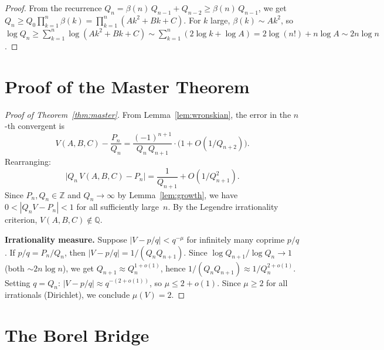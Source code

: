 \documentclass[11pt,a4paper]{article}
\theoremstyle{definition}
\theoremstyle{remark}
\begin{document}
\begin{proof}
From the recurrence $Q_n = \beta(n)\,Q_{n-1} + Q_{n-2} \ge \beta(n)\,Q_{n-1}$,
we get $Q_n \ge Q_0 \prod_{k=1}^{n} \beta(k) = \prod_{k=1}^{n}(Ak^2+Bk+C)$.
For $k$ large, $\beta(k) \sim Ak^2$, so
$\log Q_n \ge \sum_{k=1}^{n} \log(Ak^2+Bk+C)
\sim \sum_{k=1}^{n}(2\log k + \log A)
= 2\log(n!) + n\log A \sim 2n\log n$.
\end{proof}


\section{Proof of the Master Theorem}\label{sec:proof}

\begin{proof}[Proof of Theorem~\ref{thm:master}]
From Lemma~\ref{lem:wronskian}, the error in the $n$-th convergent is
\begin{equation}\label{eq:error}
  V(A,B,C) - \frac{P_n}{Q_n}
  = \frac{(-1)^{n+1}}{Q_n\,Q_{n+1}}
  \cdot\bigl(1 + O(1/Q_{n+2})\bigr).
\end{equation}
Rearranging:
\begin{equation}\label{eq:legendre}
  \bigl|Q_n\,V(A,B,C) - P_n\bigr| = \frac{1}{Q_{n+1}} + O(1/Q_{n+1}^2).
\end{equation}
Since $P_n, Q_n \in \mathbb{Z}$ and $Q_n \to \infty$ by
Lemma~\ref{lem:growth}, we have
$0 < |Q_n V - P_n| < 1$ for all sufficiently large~$n$.
By the Legendre irrationality criterion, $V(A,B,C) \notin \mathbb{Q}$.

\medskip
\noindent\textbf{Irrationality measure.}
Suppose $|V - p/q| < q^{-\mu}$ for infinitely many coprime $p/q$.
If $p/q = P_n/Q_n$, then $|V - p/q| = 1/(Q_n Q_{n+1})$.
Since $\log Q_{n+1}/\log Q_n \to 1$ (both $\sim 2n\log n$), we get
$Q_{n+1} \approx Q_n^{1+o(1)}$, hence
$1/(Q_n Q_{n+1}) \approx 1/Q_n^{2+o(1)}$.
Setting $q = Q_n$: $|V - p/q| \approx q^{-(2+o(1))}$, so $\mu \le 2 + o(1)$.
Since $\mu \ge 2$ for all irrationals (Dirichlet), we conclude $\mu(V) = 2$.
\end{proof}


\section{The Borel Bridge}\label{sec:borel}
\end{document}
